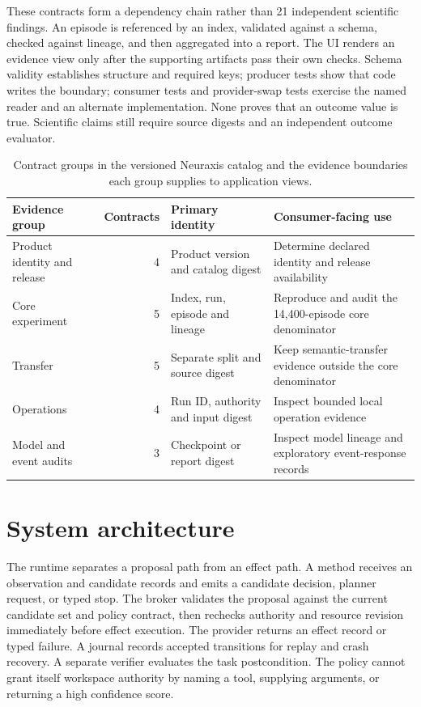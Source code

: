 These contracts form a dependency chain rather than 21 independent scientific findings. An episode is referenced by an index, validated against a schema, checked against lineage, and then aggregated into a report. The UI renders an evidence view only after the supporting artifacts pass their own checks. Schema validity establishes structure and required keys; producer tests show that code writes the boundary; consumer tests and provider-swap tests exercise the named reader and an alternate implementation. None proves that an outcome value is true. Scientific claims still require source digests and an independent outcome evaluator.
\begin{table}[H]\centering\small
\begin{tabularx}{.95\linewidth}{lrlX}\toprule
Evidence group & Contracts & Primary identity & Consumer-facing use\\\midrule
Product identity and release & 4 & Product version and catalog digest & Determine declared identity and release availability\\
Core experiment & 5 & Index, run, episode and lineage & Reproduce and audit the 14,400-episode core denominator\\
Transfer & 5 & Separate split and source digest & Keep semantic-transfer evidence outside the core denominator\\
Operations & 4 & Run ID, authority and input digest & Inspect bounded local operation evidence\\
Model and event audits & 3 & Checkpoint or report digest & Inspect model lineage and exploratory event-response records\\\bottomrule
\end{tabularx}
\caption{Contract groups in the versioned Neuraxis catalog and the evidence boundaries each group supplies to application views.}\label{tab:contract-families}\end{table}


\section{System architecture}
The runtime separates a proposal path from an effect path. A method receives an observation and candidate records and emits a candidate decision, planner request, or typed stop. The broker validates the proposal against the current candidate set and policy contract, then rechecks authority and resource revision immediately before effect execution. The provider returns an effect record or typed failure. A journal records accepted transitions for replay and crash recovery. A separate verifier evaluates the task postcondition. The policy cannot grant itself workspace authority by naming a tool, supplying arguments, or returning a high confidence score.

